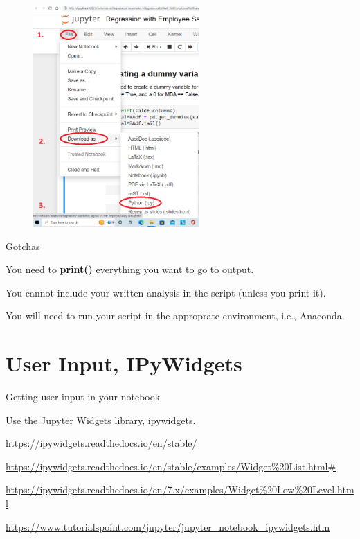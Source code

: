 \documentclass{beamer}
\begin{document}
\begin{frame}
   \begin{figure}[!ht]
        \begin{center}
            \includegraphics[width=2.5in]{DownloadAsPython.png}
        \end{center}
    \end{figure} 
\end{frame}

\begin{frame}
    \LARGE Gotchas

    \normalsize
    You need to \textbf{print()} everything you want to go to output.

    You cannot include your written analysis in the script (unless you print it).

    You will need to run your script in the approprate environment, i.e., Anaconda.
    
\end{frame}

\section{User Input, IPyWidgets}



\begin{frame}
    \LARGE Getting user input in your notebook

    \normalsize
    Use the Jupyter Widgets library, ipywidgets.

    \url{https://ipywidgets.readthedocs.io/en/stable/ }

    \url{https://ipywidgets.readthedocs.io/en/stable/examples/Widget\%20List.html\# }

    \url{https://ipywidgets.readthedocs.io/en/7.x/examples/Widget\%20Low\%20Level.html }

    \url{https://www.tutorialspoint.com/jupyter/jupyter\_notebook\_ipywidgets.htm }
    
\end{frame}
\end{document}
